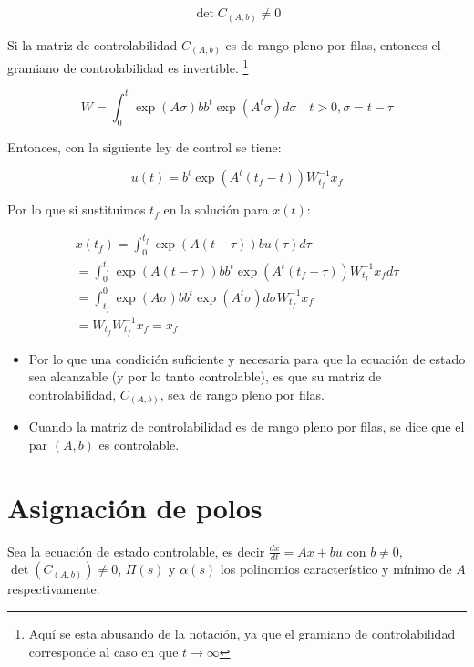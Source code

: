 \begin{equation}
\det{C_{(A,b)}} \ne 0
\end{equation}

Si la matriz de controlabilidad $C_{(A,b)}$ es de rango pleno por filas, entonces el gramiano de controlabilidad es invertible. \footnote{Aquí se esta abusando de la notación, ya que el gramiano de controlabilidad corresponde al caso en que $t \to \infty$}

\begin{equation}
W = \int_0^t \exp{(A \sigma)} b b^t \exp{(A^t \sigma)} d\sigma \quad t > 0, \sigma = t - \tau
\end{equation}

Entonces, con la siguiente ley de control se tiene:

\begin{equation}
u(t) = b^t \exp{(A^t(t_f - t))} W_{t_f}^{-1} x_f
\end{equation}

Por lo que si sustituimos $t_f$ en la solución para $x(t)$:

\begin{multline}
x(t_f) = \int_0^{t_f} \exp{(A(t - \tau))} b u(\tau) d\tau \\
       = \int_0^{t_f} \exp{(A(t - \tau))} b b^t \exp{(A^t(t_f - \tau))} W_{t_f}^{-1} x_f d\tau \\
       = \int_{t_f}^0 \exp{(A \sigma)} b b^t \exp{(A^t \sigma)} d\sigma W_{t_f}^{-1} x_f \\
       = W_{t_f} W_{t_f}^{-1} x_f = x_f
\end{multline}

\begin{itemize}
\item Por lo que una condición suficiente y necesaria para que la ecuación de estado sea alcanzable (y por lo tanto controlable), es que su matriz de controlabilidad, $C_{(A,b)}$, sea de rango pleno por filas.
\item Cuando la matriz de controlabilidad es de rango pleno por filas, se dice que el par $(A, b)$ es controlable.
\end{itemize}

\section{Asignación de polos}

Sea la ecuación de estado controlable, es decir $\frac{dx}{dt} = Ax + bu$ con $b \ne 0$, $\det{(C_{(A,b)})} \ne 0$, $\Pi(s)$ y $\alpha(s)$ los polinomios característico y mínimo de $A$ respectivamente.

